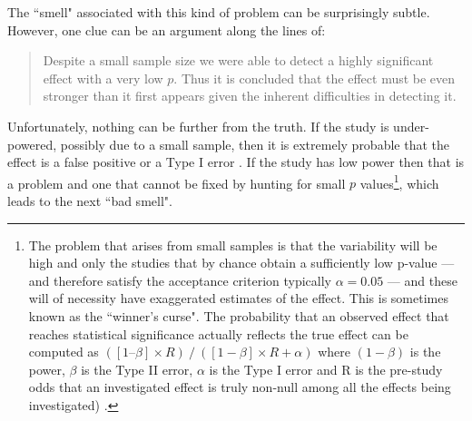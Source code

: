 \documentclass[preprint,10pt]{elsarticle}
\newcommand{\RED}{\color{red}}
\newcommand{\BLACK}{\color{black}}
\begin{document}

\noindent
The ``smell" associated with this kind of problem can be surprisingly subtle.  However, one clue can be an argument along the lines of:
\begin{quote}
    Despite a small sample size we were able to detect a highly significant effect with a very low $p$. Thus it is concluded that the effect must be even stronger than it first appears given the inherent difficulties in detecting it.
\end{quote}

\noindent
Unfortunately, nothing can be further from the truth.  If the study is under-powered, possibly due to a small sample, then it is extremely probable that the effect is a false positive or a Type I error \cite{Loke17}.  If the study has low power then that is a problem and one that cannot be fixed by hunting for small $p$ values\footnote{\RED The problem that arises from small samples is that the variability will be high and only the studies that by chance obtain a sufficiently low p-value --- and therefore satisfy the acceptance criterion typically $\alpha=0.05$ --- and these will of necessity have exaggerated estimates of the effect. This is sometimes known as the ``winner's curse".  The probability that an observed effect that reaches statistical significance actually reflects the true effect can be computed as $([1 – \beta] \times R) ⁄ ([1− \beta] \times R + \alpha)$ where $(1−\beta)$ is the power, $\beta$ is the Type II error, $\alpha$ is the Type I error and R is the pre-study odds that an investigated effect is truly non-null among all the effects being investigated) \cite{Loke17,Szuc17}. \BLACK }, which leads to the next ``bad smell".
\end{document}
